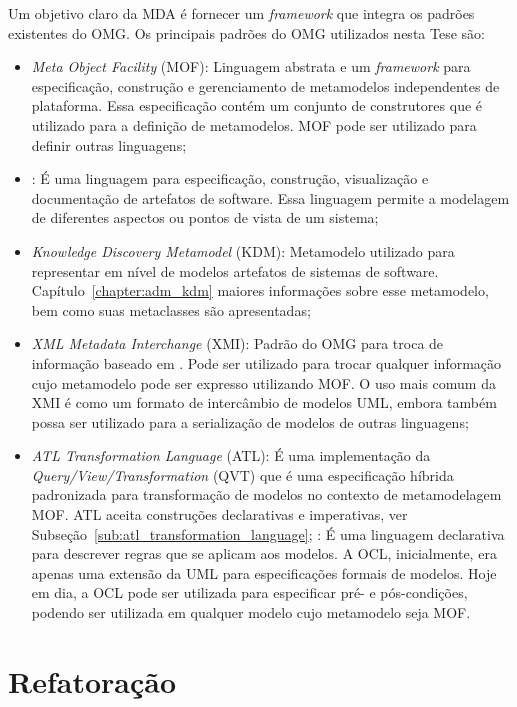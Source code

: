 Um objetivo claro da MDA é fornecer um \textit{framework} que integra os padrões existentes do OMG. Os principais padrões do OMG utilizados nesta Tese são:

\begin{itemize}
\item \textit{Meta Object Facility} (MOF): Linguagem abstrata e um \textit{framework} para especificação, construção e gerenciamento de metamodelos independentes de plataforma. Essa especificação contém um conjunto de construtores que é utilizado para a definição de metamodelos. MOF pode ser utilizado para definir outras linguagens;
\item {}: É uma linguagem para especificação, construção, visualização e documentação de artefatos de software. Essa linguagem permite a modelagem de diferentes aspectos ou pontos de vista de um sistema;
\item \textit{Knowledge Discovery Metamodel} (KDM): Metamodelo utilizado para representar em nível de modelos artefatos de sistemas de software. Capítulo~\ref{chapter:adm_kdm} maiores informações sobre esse metamodelo, bem como suas metaclasses são apresentadas;
\item \textit{XML Metadata Interchange} (XMI): Padrão do OMG para troca de informação baseado em . Pode ser utilizado para trocar qualquer informação cujo metamodelo pode ser expresso utilizando MOF. O uso mais comum da XMI é como um formato de intercâmbio de modelos UML, embora também possa ser utilizado para a serialização de modelos de outras linguagens;
\item \textit{ATL Transformation Language} (ATL): É uma implementação da \textit{Query/View/Transformation} (QVT) que é uma especificação híbrida padronizada para transformação de modelos no contexto de metamodelagem MOF. ATL aceita construções declarativas e imperativas, ver Subseção~\ref{sub:atl_transformation_language};
: É uma linguagem declarativa para descrever regras que se aplicam aos modelos. A OCL, inicialmente, era apenas uma extensão da UML para especificações formais de modelos. Hoje em dia, a OCL pode ser utilizada para especificar pré- e pós-condições, podendo ser utilizada em qualquer modelo cujo metamodelo seja MOF.
\end{itemize}

\section{Refatoração}\label{sec:refatoracao}

